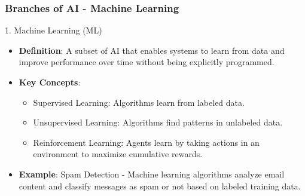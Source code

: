 \documentclass{beamer}
\begin{document}
\begin{frame}[fragile]
    \frametitle{Branches of AI - Machine Learning}
    \begin{block}{1. Machine Learning (ML)}
        \begin{itemize}
            \item \textbf{Definition}: A subset of AI that enables systems to learn from data and improve performance over time without being explicitly programmed.
            \item \textbf{Key Concepts}:
            \begin{itemize}
                \item Supervised Learning: Algorithms learn from labeled data.
                \item Unsupervised Learning: Algorithms find patterns in unlabeled data.
                \item Reinforcement Learning: Agents learn by taking actions in an environment to maximize cumulative rewards.
            \end{itemize}
            \item \textbf{Example}: Spam Detection - Machine learning algorithms analyze email content and classify messages as spam or not based on labeled training data.
        \end{itemize}
    \end{block}
\end{frame}
\end{document}
